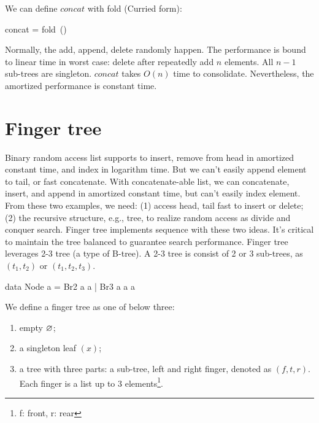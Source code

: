\documentclass[b5paper]{article}
\begin{document}
We can define $concat$ with fold (Curried form):

\be
concat = fold\ (\doubleplus)\ \nil
\ee

Normally, the add, append, delete randomly happen. The performance is bound to linear time in worst case: delete after repeatedly add $n$ elements. All $n-1$ sub-trees are singleton. $concat$ takes $O(n)$ time to consolidate. Nevertheless, the amortized performance is constant time.


\section{Finger tree}

Binary random access list supports to insert, remove from head in amortized constant time, and index in logarithm time. But we can't easily append element to tail, or fast concatenate. With concatenate-able list, we can concatenate, insert, and append in amortized constant time, but can't easily index element. From these two examples, we need: (1) access head, tail fast to insert or delete; (2) the recursive structure, e.g., tree, to realize random access as divide and conquer search. Finger tree\cite{finger-tree-1977} implements sequence with these two ideas\cite{finger-tree-2006}. It's critical to maintain the tree balanced to guarantee search performance. Finger tree leverages 2-3 tree (a type of B-tree). A 2-3 tree is consist of 2 or 3 sub-trees, as $(t_1, t_2)$ or $(t_1, t_2, t_3)$.

\lstset{frame = single}
\begin{Haskell}
data Node a = Br2 a a | Br3 a a a
\end{Haskell}

We define a finger tree as one of below three:

\begin{enumerate}
\item empty $\varnothing$;
\item a singleton leaf $(x)$;
\item a tree with three parts: a sub-tree, left and right finger, denoted as $(f, t, r)$. Each finger is a list up to 3 elements\footnote{f: front, r: rear}.
\end{enumerate}
\end{document}
